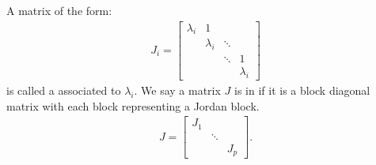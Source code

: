     \begin{definition}
        A matrix of the form:
            \begin{equation*}
            \begin{split}
                J_i = 
                \begin{bmatrix}
                    \lambda_i & 1            &      &   \\
                            & \lambda_i    & \ddots &   \\
                            &            & \ddots & 1   \\
                            &            &      & \lambda_i       
                \end{bmatrix}
            \end{split}
            \end{equation*}
        is called a  associated to $\lambda_i$. We say a matrix $J$ is in  if it is a block diagonal matrix with each block representing a Jordan block.
            \begin{equation*}
            \begin{split}
                J = 
                \begin{bmatrix}
                    J_1 & \;     & \; \\
                    \;  & \ddots & \; \\ 
                    \;  & \;     & J_p
                \end{bmatrix}.
            \end{split}
            \end{equation*}
    \end{definition}

